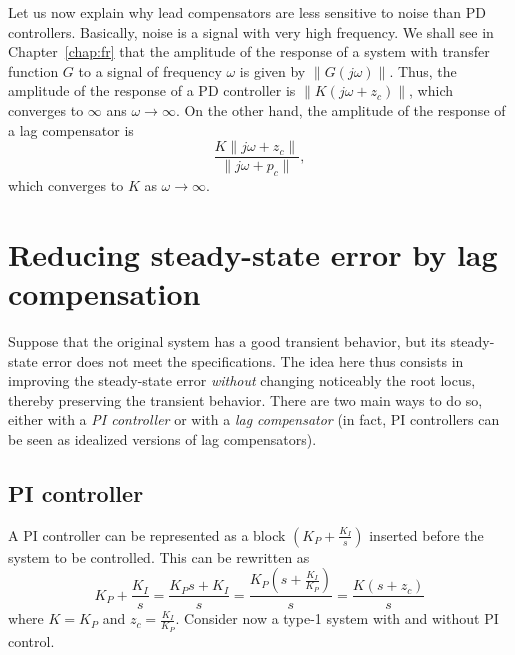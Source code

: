 \documentclass[a4paper,11pt]{report}
\theoremstyle{definition}
\begin{document}
Let us now explain why lead compensators are less sensitive to noise
than PD controllers. Basically, noise is a signal with very high
frequency. We shall see in Chapter~\ref{chap:fr} that the amplitude of
the response of a system with transfer function $G$ to a signal of
frequency $\omega$ is given by $\|G(j\omega)\|$. Thus, the amplitude
of the response of a PD controller is $\|K(j\omega+z_c)\|$, which
converges to $\infty$ ans $\omega\to\infty$. On the other hand, the
amplitude of the response of a lag compensator is
\[
\frac{K\|j\omega+z_c\|}{\|j\omega+p_c\|},
\]
which converges to $K$ as $\omega\to\infty$.


\section{Reducing steady-state error by lag compensation}

Suppose that the original system has a good transient behavior, but
its steady-state error does not meet the specifications. The idea here
thus consists in improving the steady-state error \emph{without}
changing noticeably the root locus, thereby preserving the transient
behavior. There are two main ways to do so, either with a \emph{PI
  controller} or with a \emph{lag compensator} (in fact, PI
controllers can be seen as idealized versions of lag compensators).

\subsection{PI controller}

A PI controller can be represented as a block $(K_P+\frac{K_I}{s})$
inserted before the system to be controlled. This can be rewritten as
\[
K_P+\frac{K_I}{s} = \frac{K_Ps+K_I}{s} =
\frac{K_P\left(s+\frac{K_I}{K_P}\right)}{s} = \frac{K(s+z_c)}{s}
\]
where $K=K_P$ and $z_c=\frac{K_I}{K_P}$. Consider now a type-1 system
with and without PI control.
\end{document}

